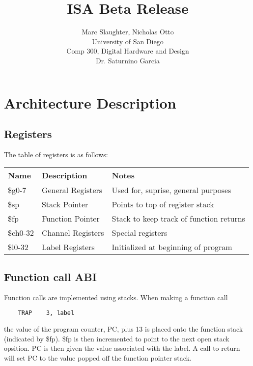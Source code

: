 \documentclass{report}
\begin{document}
\title{ISA Beta Release}
\author{Marc Slaughter, Nicholas Otto\\
University of San Diego\\
Comp 300, Digital Hardware and Design\\
Dr. Saturnino Garcia}
\maketitle

\chapter{Architecture Description}
\section{Registers}
The table of registers is as follows:
\begin{center}
    \begin{tabularx}{1.0\textwidth}{|L{1} L{1} L{1} |}
        \hline 
        Name        & Description & Notes\\
        \hline
        \$g0-7      & General Registers & Used for, suprise, general purposes\\
        \$sp        & Stack Pointer     & Points to top of register stack\\
        \$fp        & Function Pointer  & Stack to keep track of function returns\\
        \$ch0-32    & Channel Registers & Special registers\\
        \$l0-32      & Label Registers   & Initialized at beginning of program\\
        \hline
    \end{tabularx}
\end{center}

\section{Function call ABI}
Function calls are implemented using stacks.  When making a function call
\begin{verbatim}
    TRAP    3, label
\end{verbatim}
the value of the program counter, PC, plus 13 is placed onto the function stack (indicated by \$fp).  \$fp is then incremented to point to the next open stack opsition.
PC is then given the value associated with the label.  
A call to return will set PC to the value popped off the function pointer stack.
\end{document}
